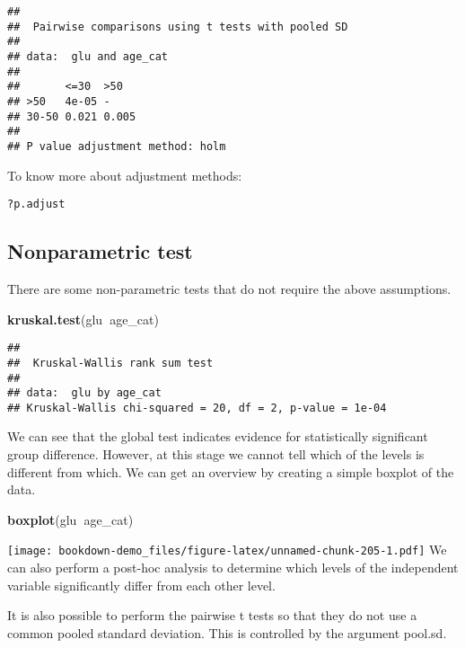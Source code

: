 \documentclass[]{book}
\newenvironment{Shaded}{\begin{snugshade}}{\end{snugshade}}
\newcommand{\KeywordTok}[1]{\textcolor[rgb]{0.13,0.29,0.53}{\textbf{#1}}}
\newcommand{\OperatorTok}[1]{\textcolor[rgb]{0.81,0.36,0.00}{\textbf{#1}}}
\newcommand{\NormalTok}[1]{#1}
\theoremstyle{definition}
\theoremstyle{definition}
\theoremstyle{definition}
\theoremstyle{remark}
\begin{document}
\begin{verbatim}
## 
##  Pairwise comparisons using t tests with pooled SD 
## 
## data:  glu and age_cat 
## 
##       <=30  >50  
## >50   4e-05 -    
## 30-50 0.021 0.005
## 
## P value adjustment method: holm
\end{verbatim}

To know more about adjustment methods:

\begin{verbatim}
?p.adjust
\end{verbatim}

\subsection{Nonparametric test}\label{nonparametric-test}

There are some non-parametric tests that do not require the above
assumptions.

\begin{Shaded}
\begin{Highlighting}[]
\KeywordTok{kruskal.test}\NormalTok{(glu}\OperatorTok{~}\NormalTok{age_cat)}
\end{Highlighting}
\end{Shaded}

\begin{verbatim}
## 
##  Kruskal-Wallis rank sum test
## 
## data:  glu by age_cat
## Kruskal-Wallis chi-squared = 20, df = 2, p-value = 1e-04
\end{verbatim}

We can see that the global test indicates evidence for statistically
significant group difference. However, at this stage we cannot tell
which of the levels is different from which. We can get an overview by
creating a simple boxplot of the data.

\begin{Shaded}
\begin{Highlighting}[]
\KeywordTok{boxplot}\NormalTok{(glu}\OperatorTok{~}\NormalTok{age_cat)}
\end{Highlighting}
\end{Shaded}

\texttt{[image: bookdown-demo\_files/figure-latex/unnamed-chunk-205-1.pdf]}
We can also perform a post-hoc analysis to determine which levels of the
independent variable significantly differ from each other level.

It is also possible to perform the pairwise t tests so that they do not
use a common pooled standard deviation. This is controlled by the
argument pool.sd.
\end{document}
